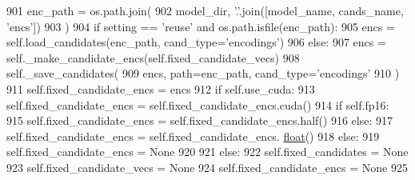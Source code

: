 \begin{DoxyCode}
901                     enc\_path = os.path.join(
902                         model\_dir, \textcolor{stringliteral}{'.'}.join([model\_name, cands\_name, \textcolor{stringliteral}{'encs'}])
903                     )
904                     \textcolor{keywordflow}{if} setting == \textcolor{stringliteral}{'reuse'} \textcolor{keywordflow}{and} os.path.isfile(enc\_path):
905                         encs = self.load\_candidates(enc\_path, cand\_type=\textcolor{stringliteral}{'encodings'})
906                     \textcolor{keywordflow}{else}:
907                         encs = self.\_make\_candidate\_encs(self.fixed\_candidate\_vecs)
908                         self.\_save\_candidates(
909                             encs, path=enc\_path, cand\_type=\textcolor{stringliteral}{'encodings'}
910                         )
911                     self.fixed\_candidate\_encs = encs
912                     \textcolor{keywordflow}{if} self.use\_cuda:
913                         self.fixed\_candidate\_encs = self.fixed\_candidate\_encs.cuda()
914                     \textcolor{keywordflow}{if} self.fp16:
915                         self.fixed\_candidate\_encs = self.fixed\_candidate\_encs.half()
916                     \textcolor{keywordflow}{else}:
917                         self.fixed\_candidate\_encs = self.fixed\_candidate\_encs.
      \hyperlink{namespaceprojects_1_1controllable__dialogue_1_1make__control__dataset_aa2b7207688c641dbc094ab44eca27113}{float}()
918                 \textcolor{keywordflow}{else}:
919                     self.fixed\_candidate\_encs = \textcolor{keywordtype}{None}
920 
921             \textcolor{keywordflow}{else}:
922                 self.fixed\_candidates = \textcolor{keywordtype}{None}
923                 self.fixed\_candidate\_vecs = \textcolor{keywordtype}{None}
924                 self.fixed\_candidate\_encs = \textcolor{keywordtype}{None}
925 
\end{DoxyCode}
\mbox{\label{classparlai_1_1core_1_1torch__ranker__agent_1_1TorchRankerAgent_a9b90f2718c85b6373ead4cd207cfd3d8}} 

